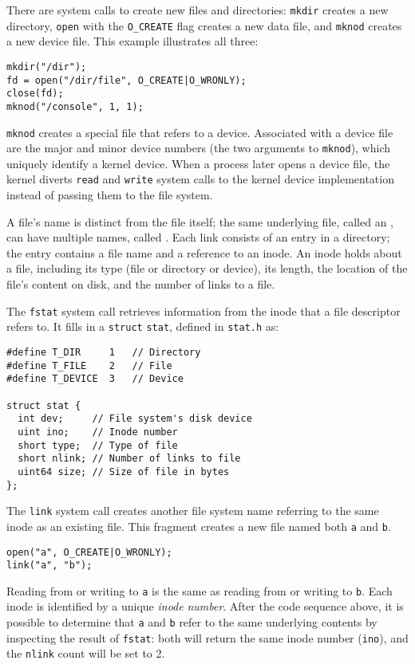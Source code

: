 There are system calls to create new files and directories:
\lstinline{mkdir}
creates a new directory,
\lstinline{open}
with the
\lstinline{O_CREATE}
flag creates a new data file,
and
\lstinline{mknod}
creates a new device file.
This example illustrates all three:
\begin{lstlisting}[]
mkdir("/dir");
fd = open("/dir/file", O_CREATE|O_WRONLY);
close(fd);
mknod("/console", 1, 1);
\end{lstlisting}
\lstinline{mknod}
creates a special file that refers to a device.
Associated with a device file are
the major and minor device numbers
(the two arguments to
\lstinline{mknod}),
which uniquely identify a kernel device.
When a process later opens a device file, the kernel
diverts
\lstinline{read}
and
\lstinline{write}
system calls to the kernel device implementation
instead of passing them to the file system.

A file's name is distinct from the file itself;
the same underlying file, called an
,
can have multiple names,
called
.
Each link consists of an entry in a directory;
the entry contains a file name and a reference
to an inode.
An inode holds
about a file, including
its type (file or directory or device),
its length,
the location of the file's content on disk,
and the number of links to a file.

The
\lstinline{fstat}
system call
retrieves information from the inode that a
file descriptor refers to.
It fills in a
\lstinline{struct}
\lstinline{stat},
defined in
\lstinline{stat.h} 
as:
\begin{lstlisting}[]
#define T_DIR     1   // Directory
#define T_FILE    2   // File
#define T_DEVICE  3   // Device

struct stat {
  int dev;     // File system's disk device
  uint ino;    // Inode number
  short type;  // Type of file
  short nlink; // Number of links to file
  uint64 size; // Size of file in bytes
};
\end{lstlisting}

The
\lstinline{link}
system call creates another file system name
referring to the same inode as an existing file.
This fragment creates a new file named both
\lstinline{a}
and
\lstinline{b}.
\begin{lstlisting}[]
open("a", O_CREATE|O_WRONLY);
link("a", "b");
\end{lstlisting}
Reading from or writing to
\lstinline{a}
is the same as reading from or writing to
\lstinline{b}.
Each inode is identified by a unique
\textit{inode}
\textit{number}.
After the code sequence above, it is possible
to determine that
\lstinline{a}
and
\lstinline{b}
refer to the same underlying contents by inspecting the
result of
\lstinline{fstat}:
both will return the same inode number
(\lstinline{ino}),
and the
\lstinline{nlink}
count will be set to 2.

